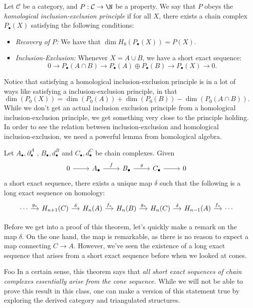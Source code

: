 \begin{definition}
Let $\mathcal C$ be a category, and $P: \mathcal C\to \N$ be a property. We say that $P$ obeys the \emph{homological inclusion-exclusion principle} if for all $X$, there exists a chain complex $P_\bullet(X)$ satisfying the following conditions:
\begin{itemize}
\item \emph{Recovery of $P$:} We have that $\dim H_0(P_\bullet(X))=P(X).$
\item \emph{Inclusion-Exclusion:} Whenever $X=A\cup B$, we have a short exact sequence:
\[0\to P_\bullet(A\cap B)\to P_\bullet(A)\oplus P_\bullet(B)\to P_\bullet(X)\to 0.\]
\end{itemize}
\end{definition}
Notice that satisfying a homological inclusion-exclusion principle is in a lot of ways like satisfying a inclusion-exclusion principle, in that 
\[\dim(P_0(X))= \dim (P_0(A))+\dim(P_0(B))-\dim(P_0(A\cap B)).\]
While we don't get an actual inclusion exclusion principle from a homological inclusion-exclusion principle, we get something very close to the principle holding. In order to see the relation between inclusion-exclusion and homological inclusion-exclusion, we need a powerful lemma from homological algebra. 
\begin{theorem}
Let $ A_\bullet,\partial^A_\bullet$ , $ B_\bullet,d^B_\bullet$ and $C_\bullet,d^C_\bullet$ be chain complexes. Given 
\[\begin{tikzcd} 0\arrow{r}&  A_\bullet \arrow{r}{f}& B_\bullet \arrow{r}{g} &C_\bullet \arrow{r} &0\end{tikzcd}\] a short exact sequence, there exists a unique map $\delta$ such that the following is a long exact sequence on homology:
\[\begin{tikzcd}[column sep=small] \cdots \arrow{r}{g_*}&H_{n+1}(C)\arrow{r}{\delta}& H_n ( A)\arrow{r}{f_*}& H_n( B)\arrow{r}{g_*}& H_n(C)\arrow{r}{\delta}& H_{n-1}( A)\arrow{r}{f_*}&\cdots \end{tikzcd}\] \label{lemma:zigzag}
\end{theorem}
Before we get into a proof of this theorem, let's quickly make a remark on the map $\delta$. On the one hand, the map is remarkable, as there is no reason to expect a map connecting $C\to A$. However, we've seen the existence of a long exact sequence that arises from a short exact sequence before when we looked at cones. \\
\begin{projectdescription}{Foo}
In a certain sense, this theorem says that \emph{all short exact sequences of chain complexes essentially arise from the cone sequence.} While we will not be able to prove this result in this class, one can make a version of this statement true by exploring the derived category and triangulated structures.  \label{proj:derived}
\end{projectdescription}
